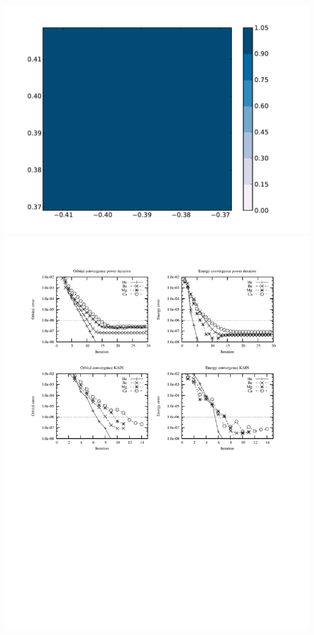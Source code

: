\documentclass [a4paper, landscape]{report}
\begin{document}
\noindent
\includegraphics[scale=0.1, clip, viewport = 100 100 370 362]{densematrix.pdf}
\includegraphics[scale=0.1, clip, viewport = 100 000 370 262]{../accuracy.pdf}
\end{document}

